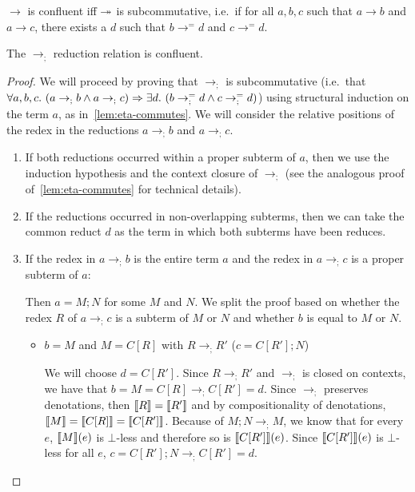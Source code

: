 \begin{lemma}\label{lem:subcommutativity}
  $\to$ is confluent iff $\twoheadrightarrow$ is subcommutative, i.e.\ if for all
  $a, b, c$ such that $a \to b$ and $a \to c$, there exists a $d$ such that
  $b \to^= d$ and $c \to^= d$.
\end{lemma}

\begin{lemma}\label{lem:semicolon-confluent}
  The $\to_;$ reduction relation is confluent.
\end{lemma}

\begin{proof}
  We will proceed by proving that $\to_;$ is subcommutative (i.e.\ that
  $\forall a, b, c.\ (a \to_; b \land a \to_; c) \Rightarrow \exists d.\ (b \to_;^=
  d \land c \to_;^= d)$) using structural induction on the term $a$, as
  in~\ref{lem:eta-commutes}. We will consider the relative positions of the
  redex in the reductions $a \to_; b$ and $a \to_; c$.

  \begin{enumerate}
  \item If both reductions occurred within a proper subterm of $a$, then we
    use the induction hypothesis and the context closure of $\to_;$ (see
    the analogous proof of~\ref{lem:eta-commutes} for technical details).

  \item If the reductions occurred in non-overlapping subterms, then we can
    take the common reduct $d$ as the term in which both subterms have been
    reduces.

  \item If the redex in $a \to_; b$ is the entire term $a$ and the redex in
    $a \to_; c$ is a proper subterm of $a$:

    Then $a = M; N$ for some $M$ and $N$. We split the proof based on
    whether the redex $R$ of $a \to_; c$ is a subterm of $M$ or $N$ and
    whether $b$ is equal to $M$ or $N$.
    \begin{itemize}
    \item $b = M$ and $M = C[R]$ with $R \to_; R'$ ($c = C[R']; N$)

      We will choose $d = C[R']$. Since $R \to_; R'$ and $\to_;$ is closed
      on contexts, we have that $b = M = C[R] \to_; C[R'] = d$. Since
      $\to_;$ preserves denotations, then $\llbracket R \rrbracket = \llbracket R' \rrbracket$ and by
      compositionality of denotations,
      $\llbracket M \rrbracket = \llbracket C[R] \rrbracket = \llbracket C[R'] \rrbracket$. Because of $M; N \to_; M$, we
      know that for every $e$, $\llbracket M \rrbracket(e)$ is $\bot$-less and therefore so
      is $\llbracket C[R'] \rrbracket(e)$. Since $\llbracket C[R'] \rrbracket(e)$ is $\bot$-less for all
      $e$, $c = C[R']; N \to_; C[R'] = d$.


\end{itemize}
\end{enumerate}
\end{proof}
